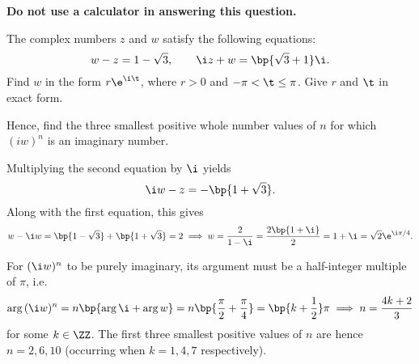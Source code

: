 \begin{problem}
    \textbf{Do not use a calculator in answering this question.}

    The complex numbers $z$ and $w$ satisfy the following equations: \[w - z = 1 - \sqrt3, \qquad \i z + w = \bp{\sqrt3 + 1} \i.\] Find $w$ in the form $r\e^{\i \t}$, where $r > 0$ and $-\pi < \t \leq \pi$. Give $r$ and $\t$ in exact form.

    Hence, find the three smallest positive whole number values of $n$ for which $(iw)^n$ is an imaginary number.
\end{problem}
\begin{solution}
    Multiplying the second equation by $\i$ yields \[\i w - z = -\bp{1 + \sqrt3}.\] Along with the first equation, this gives \[w - \i w = \bp{1 - \sqrt3} + \bp{1 + \sqrt3} = 2 \implies w = \frac2{1-\i} = \frac{2\bp{1 + \i}}{2} = 1 + \i = \sqrt{2} \e^{\i \pi/4}.\]

    For $(\i w)^n$ to be purely imaginary, its argument must be a half-integer multiple of $\pi$, i.e. \[\arg{(\i w)^n} = n \bp{\arg{\i} + \arg{w}} = n \bp{\frac\pi2 + \frac\pi4} = \bp{k + \frac12} \pi \implies n = \frac{4k+2}{3}\] for some $k \in \ZZ$. The first three smallest positive values of $n$ are hence $n = 2, 6, 10$ (occurring when $k = 1, 4, 7$ respectively).
\end{solution}

